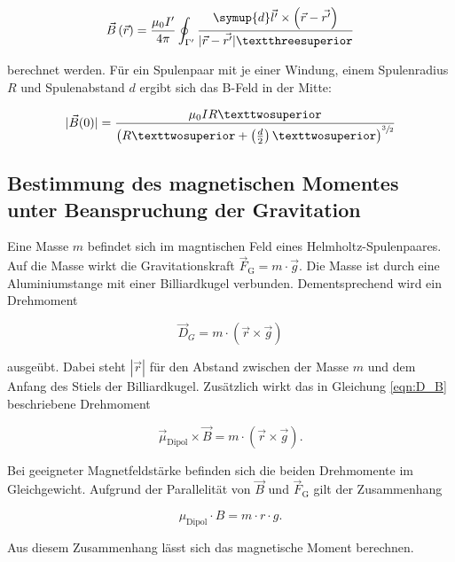 \begin{equation*}
    \vec{B}\left(\vec{r}\right) = \frac{\mu_{0}I'}{4\pi}\oint_{\Gamma'} \frac{\symup{d}\vec{l'} \times \left(\vec{r} - \vec{r'}\right)}{| \vec{r} - \vec{r'} |³}
\end{equation*}

\noindent berechnet werden. Für ein Spulenpaar mit je einer Windung, einem Spulenradius $R$ und Spulenabstand $d$ ergibt sich das B-Feld in der Mitte:

\begin{equation}
\label{eqn:B0}
    | \vec{B}(0) | = \frac{\mu_{0}IR²}{\left(R²+\left(\frac{d}{2}\right)²\right)^{\sfrac{3}{2}}}
\end{equation}

\subsection{Bestimmung des magnetischen Momentes unter Beanspruchung der Gravitation}

\noindent Eine Masse $m$ befindet sich im magntischen Feld eines Helmholtz-Spulenpaares. Auf die Masse wirkt die Gravitationskraft 
$\vec{F}_\text{G} = m \cdot \vec{g}$. Die Masse ist durch eine Aluminiumstange mit einer Billiardkugel verbunden. Dementsprechend 
wird ein Drehmoment 

\begin{equation*}
    \vec{D}_{G} = m \cdot \left(\vec{r} \times \vec{g}\right)
\end{equation*}

\noindent ausgeübt. Dabei steht $| \vec{r} |$ für den Abstand zwischen der Masse $m$ und dem Anfang des Stiels der Billiardkugel.
Zusätzlich wirkt das in Gleichung \eqref{eqn:D_B} beschriebene Drehmoment 

\begin{equation*}
    \vec{\mu}_\text{Dipol} \times \vec{B} = m \cdot \left(\vec{r} \times \vec{g}\right).
\end{equation*}

\noindent Bei geeigneter Magnetfeldstärke befinden sich die beiden Drehmomente im Gleichgewicht. Aufgrund der Parallelität von $\vec{B}$ und
$\vec{F}_\text{G}$ gilt der Zusammenhang

\begin{equation}
\label{eqn:Gravitation}
    \mu_\text{Dipol} \cdot B = m \cdot r \cdot g.
\end{equation}

\noindent Aus diesem Zusammenhang lässt sich das magnetische Moment berechnen.

